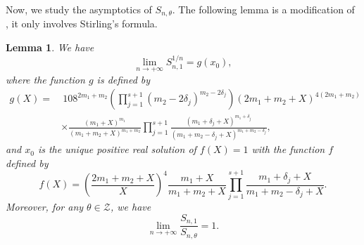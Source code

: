 \documentclass[11pt]{amsart}
\newtheorem{lemma}[theorem]{Lemma}
\numberwithin{equation}{section}
\begin{document}
\bigskip

Now, we study the asymptotics of $S_{n,\theta}$. The following lemma is a modification of \cite[Lemma~4.1]{LY20}, it only involves Stirling's formula.

\begin{lemma}\label{analysislemma}
We have
\[ \lim_{n \rightarrow +\infty} S_{n,1}^{1/n} = g(x_0), \]
where the function $g$ is defined by
\begin{align*}
g(X) = &~108^{2m_1+m_2} \left( \prod_{j=1}^{s+1} \left( m_2 - 2\delta_j \right)^{m_2 - 2\delta_j} \right) \left(2m_1+m_2+X\right)^{4(2m_1+m_2)}  \\
& \times \frac{(m_1+X)^{m_1}}{(m_1+m_2+X)^{m_1+m_2}} \prod_{j=1}^{s+1} \frac{(m_1+\delta_j+X)^{m_1+\delta_j}}{(m_1+m_2-\delta_j+X)^{m_1+m_2-\delta_j}},
\end{align*}
and $x_0$ is the unique positive real solution of $f(X) = 1$ with the function $f$ defined by
\[ f(X) = \left( \frac{2m_1+m_2+X}{X} \right)^4 \frac{m_1+X}{m_1+m_2+X} \prod_{j=1}^{s+1} \frac{m_1+\delta_j+X}{m_1+m_2-\delta_j+X}. \]
Moreover, for any $\theta \in \mathcal{Z}$, we have
\[ \lim_{n \rightarrow +\infty} \frac{S_{n,1}}{S_{n,\theta}} = 1. \]
\end{lemma}
\end{document}
